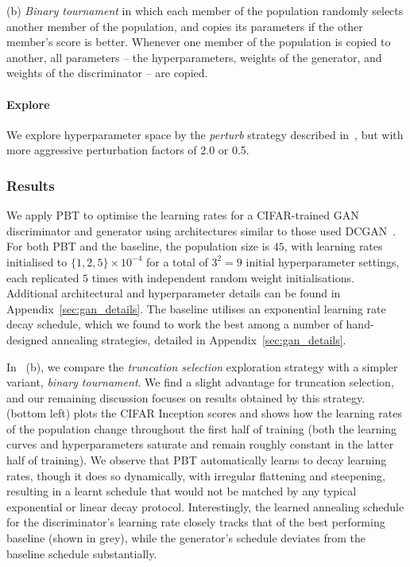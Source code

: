 (b) \emph{Binary tournament} in which each member of the population randomly selects another member of the population, and copies its parameters if the other member's score is better. Whenever one member of the population is copied to another, all parameters -- the hyperparameters, weights of the generator, and weights of the discriminator -- are copied. 
\vspace{-0.5em}\paragraph{Explore}We explore hyperparameter space by the \emph{perturb} strategy described in~, but with more aggressive perturbation factors of 2.0 or 0.5.

\subsubsection{Results}
We apply PBT to optimise the learning rates for a CIFAR-trained GAN discriminator and generator
using architectures similar to those used DCGAN~\citep{dcgan}.
For both PBT and the baseline, the population size is $45$, with learning rates initialised to
$\{1, 2, 5\}\times10^{-4}$
for a total of $3^2 = 9$ initial hyperparameter settings,
each replicated $5$ times with independent random weight initialisations.
Additional architectural and hyperparameter details can be found in Appendix~\ref{sec:gan_details}.
The baseline utilises an exponential learning rate decay schedule, which we found to work the best among a number of hand-designed annealing strategies, detailed in Appendix~\ref{sec:gan_details}.




In~ (b), we compare the \emph{truncation selection} exploration strategy with a simpler variant, \emph{binary tournament}.
We find a slight advantage for truncation selection,
and our remaining discussion focuses on results obtained by this strategy.
%
 (bottom left) plots the CIFAR Inception scores and shows how the learning rates of the population change throughout the first half of training (both the learning curves and hyperparameters saturate and remain roughly constant in the latter half of training).
We observe that PBT automatically learns to decay learning rates,
though it does so dynamically, with irregular flattening and steepening, resulting in a
learnt schedule that would not be matched by any typical exponential or linear decay protocol.
Interestingly, the learned annealing schedule for the discriminator's learning rate closely tracks that of the best performing baseline (shown in grey), while the generator's schedule deviates from the baseline schedule substantially.

